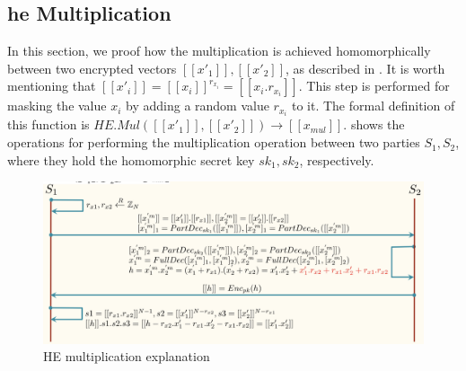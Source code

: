 \begin{appendices}

\section{\acf{he} Multiplication}
\label{app:he-multiplication}

In this section, we proof how the multiplication is achieved homomorphically between two encrypted vectors $[[x'_1]], [[x'_2]]$, as described in \cite{liu2016efficient2}.
It is worth mentioning that $[[x'_i]] = [[x_i]]^{r_{x_i}} = [[x_i . r_{x_i}]]$.
This step is performed for masking the value $x_i$ by adding a random value $r_{x_i}$ to it.
The formal definition of this function is $HE.Mul([[x'_1]], [[x'_2]]) \rightarrow [[x_{mul}]]$.
 shows the operations for performing the multiplication operation between two parties $S_1, S_2$, where they hold the homomorphic secret key $sk_1, sk_2$, respectively.

\begin{figure}[thb]
\centering
  \includegraphics[width=1\linewidth]{resources/HE-mul-explain.pdf}
  \caption{HE multiplication explanation}
  \label{fig:he-mul-explain}
\end{figure}
    

\end{appendices}
